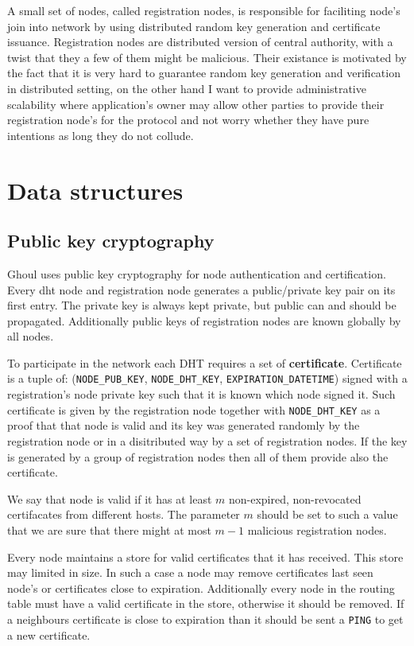 A small set of nodes, called registration nodes, is responsible for faciliting
node’s join into network by using distributed random key generation and
certificate issuance. Registration nodes are distributed version of central
authority, with a twist that they a few of them might be malicious. Their
existance is motivated by the fact that it is very hard to guarantee random key
generation and verification in distributed setting, on the other hand I want to
provide administrative scalability where application's owner may allow other
parties to provide their registration node's for the protocol and not worry
whether they have pure intentions as long they do not collude.

\section{Data structures}

\subsection{Public key cryptography}
Ghoul uses public key cryptography for node authentication and certification.
Every dht node and registration node generates a public/private key pair on its
first entry. The private key is always kept private, but public can and should
be propagated. Additionally public keys of registration nodes are known globally
by all nodes.

To participate in the network each DHT requires a set of \textbf{certificate}.
Certificate is a tuple of: (\texttt{NODE\_PUB\_KEY}, \texttt{NODE\_DHT\_KEY},
\texttt{EXPIRATION\_DATETIME}) signed with a registration's node private key
such that it is known which node signed it. Such certificate is given by the
registration node together with \texttt{NODE\_DHT\_KEY} as a proof that that
node is valid and its key was generated randomly by the registration node or in
a disitributed way by a set of registration nodes. If the key is generated by a
group of registration nodes then all of them provide also the certificate.

We say that node is valid if it has at least $m$ non-expired, non-revocated
certifacates from different hosts. The parameter $m$ should be set to such a
value that we are sure that there might at most $m-1$ malicious registration
nodes.

Every node maintains a store for valid certificates that it has received. This
store may limited in size. In such a case a node may remove certificates last
seen node's or certificates close to expiration. Additionally every node in the
routing table must have a valid certificate in the store, otherwise it should be
removed. If a neighbours certificate is close to expiration than it should be
sent a \texttt{PING} to get a new certificate.

